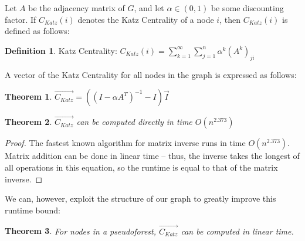 \documentclass[10pt]{article}
\newtheorem{theorem}{Theorem}[section]
\theoremstyle{definition}
\newtheorem{definition}{Definition}[section]
\begin{document}
Let $A$ be the adjacency matrix of $G$, and let $\alpha \in (0,1)$ be some discounting factor. If $C_{Katz}(i)$ denotes the Katz Centrality of a node $i$, then $C_{Katz}(i)$ is defined as follows:
\theoremstyle{definition}
\begin{definition}{Katz Centrality:}
$C_{Katz}(i) = \sum\limits_{k=1}^{\infty}\sum\limits_{j=1}^n\alpha^k(A^k)_{ji}$
\end{definition}

A vector of the Katz Centrality for all nodes in the graph is expressed as follows:

\begin{theorem}
$\overrightarrow{C_{Katz}}  = ((I - \alpha A^T)^{-1}-I)\vec{I}$
\end{theorem}

\begin{theorem}
$\overrightarrow{C_{Katz}}$ can be computed directly in time $O(n^{2.373})$
\end{theorem}
\begin{proof}
The fastest known algorithm for matrix inverse runs in time $O(n^{2.373})$. Matrix addition can be done in linear time -- thus, the inverse takes the longest of all operations in this equation, so the runtime is equal to that of the matrix inverse.
\end{proof}

We can, however, exploit the structure of our graph to greatly improve this runtime bound:

\begin{theorem}
For nodes in a pseudoforest, $\overrightarrow{C_{Katz}}$ can be computed in linear time.
\end{theorem}
\end{document}

